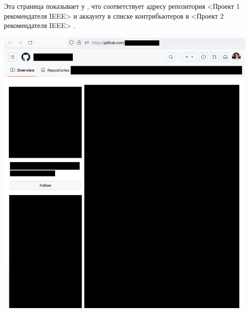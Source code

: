 
Эта страница показывает  у \MrIeeeReferenceOne,
что соответствует адресу репозитория <Проект 1 рекомендателя IEEE> 
и аккаунту в списке контрибьютеров в <Проект 2 рекомендателя IEEE> .

\begin{center}
    \includegraphics[width=35em]{ieee-reference-one-github_public}
\end{center}

\pagebreak
